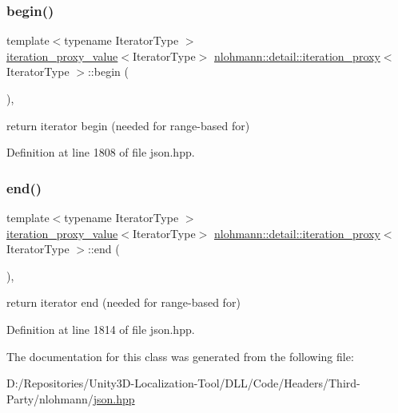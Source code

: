 \subsubsection{\texorpdfstring{begin()}{begin()}}
{\footnotesize\ttfamily template$<$typename Iterator\+Type $>$ \\
\mbox{\hyperlink{classnlohmann_1_1detail_1_1iteration__proxy__value}{iteration\+\_\+proxy\+\_\+value}}$<$Iterator\+Type$>$ \mbox{\hyperlink{classnlohmann_1_1detail_1_1iteration__proxy}{nlohmann\+::detail\+::iteration\+\_\+proxy}}$<$ Iterator\+Type $>$\+::begin (\begin{DoxyParamCaption}{ }\end{DoxyParamCaption})\hspace{0.3cm}{\ttfamily [inline]}, {\ttfamily [noexcept]}}



return iterator begin (needed for range-\/based for) 



Definition at line 1808 of file json.\+hpp.

\mbox{\label{classnlohmann_1_1detail_1_1iteration__proxy_a90091f8492d23576edef72c5e8b9d4cf}} 
\subsubsection{\texorpdfstring{end()}{end()}}
{\footnotesize\ttfamily template$<$typename Iterator\+Type $>$ \\
\mbox{\hyperlink{classnlohmann_1_1detail_1_1iteration__proxy__value}{iteration\+\_\+proxy\+\_\+value}}$<$Iterator\+Type$>$ \mbox{\hyperlink{classnlohmann_1_1detail_1_1iteration__proxy}{nlohmann\+::detail\+::iteration\+\_\+proxy}}$<$ Iterator\+Type $>$\+::end (\begin{DoxyParamCaption}{ }\end{DoxyParamCaption})\hspace{0.3cm}{\ttfamily [inline]}, {\ttfamily [noexcept]}}



return iterator end (needed for range-\/based for) 



Definition at line 1814 of file json.\+hpp.



The documentation for this class was generated from the following file\+:\begin{DoxyCompactItemize}
\item 
D\+:/\+Repositories/\+Unity3\+D-\/\+Localization-\/\+Tool/\+D\+L\+L/\+Code/\+Headers/\+Third-\/\+Party/nlohmann/\mbox{\hyperlink{json_8hpp}{json.\+hpp}}\end{DoxyCompactItemize}
